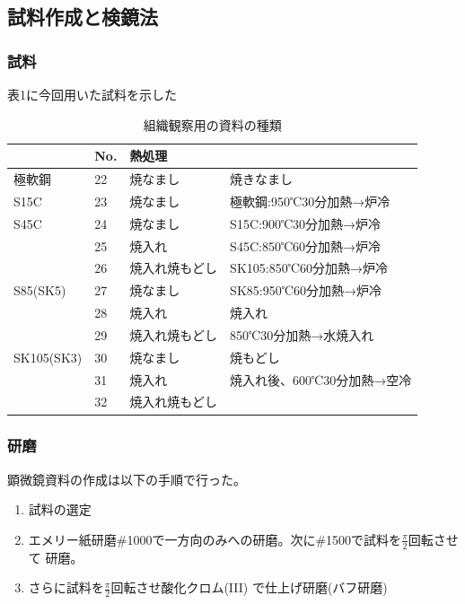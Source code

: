 \documentclass[10pt,a4j]{jsarticle}
\begin{document}
  \subsection{試料作成と検鏡法}
    \subsubsection{試料}
    表1に今回用いた試料を示した
    \begin{table}[H]
      \centering
      \caption{組織観察用の資料の種類}
        \label{my-label}
        \footnotesize
        \begin{tabular}{l|lll}
                    & No. & 熱処理     &                    \\ \hline
          極軟鋼        & 22  & 焼なまし    & 焼きなまし              \\
          S15C       & 23  & 焼なまし    & 極軟鋼:950℃30分加熱→炉冷   \\
          S45C       & 24  & 焼なまし    & S15C:900℃30分加熱→炉冷  \\
                    & 25  & 焼入れ     & S45C:850℃60分加熱→炉冷  \\
                    & 26  & 焼入れ焼もどし & SK105:850℃60分加熱→炉冷 \\
          S85(SK5)   & 27  & 焼なまし    & SK85:950℃60分加熱→炉冷  \\
                    & 28  & 焼入れ     & 焼入れ                \\
                    & 29  & 焼入れ焼もどし & 850℃30分加熱→水焼入れ     \\
          SK105(SK3) & 30  & 焼なまし    & 焼もどし               \\
                    & 31  & 焼入れ     & 焼入れ後、600℃30分加熱→空冷  \\
                    & 32  & 焼入れ焼もどし &                   
        \end{tabular}
      \end{table}
    \subsubsection{研磨}
    顕微鏡資料の作成は以下の手順で行った。
    \begin{enumerate}
      \item 試料の選定 \\
      \item エメリー紙研磨\#1000で一方向のみへの研磨。次に\#1500で試料を$\frac{\pi}{2}$回転させて
      研磨。 \\
      \item さらに試料を$\frac{\pi}{2}$回転させ酸化クロム(I\hspace{-.1em}I\hspace{-.1em}I)
      で仕上げ研磨(バフ研磨) \\
    \end{enumerate}
\end{document}
